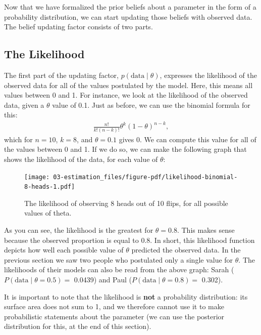 \documentclass[
  letterpaper,
  DIV=11,
  numbers=noendperiod]{scrreprt}
\begin{document}
Now that we have formalized the prior beliefs about a parameter in the
form of a probability distribution, we can start updating those beliefs
with observed data. The belief updating factor consists of two parts.

\hypertarget{the-likelihood}{%
\subsection{The Likelihood}\label{the-likelihood}}

The first part of the updating factor, \(p( \text{data} \mid \theta)\),
expresses the likelihood of the observed data for all of the values
postulated by the model. Here, this means all values between 0 and 1.
For instance, we look at the likelihood of the observed data, given a
\(\theta\) value of 0.1. Just as before, we can use the binomial formula
for this: \begin{align} 
\label{binomFormulaTwo}
\frac{n!}{k! (n-k)!} \theta^k\left(1-\theta\right)^{n-k},
\end{align} which for \(n = 10\), \(k = 8\), and \(\theta = 0.1\) gives
0. We can compute this value for all of the values between 0 and 1. If
we do so, we can make the following graph that shows the likelihood of
the data, for each value of \(\theta\):

\begin{figure}

{\centering \texttt{[image: 03-estimation\_files/figure-pdf/likelihood-binomial-8-heads-1.pdf]}

}

\caption{The likelihood of observing 8 heads out of 10 flips, for all
possible values of theta.}

\end{figure}

As you can see, the likelihood is the greatest for \(\theta = 0.8\).
This makes sense because the observed proportion is equal to \(0.8\). In
short, this likelihood function depicts how well each possible value of
\(\theta\) predicted the observed data. In the previous section we saw
two people who postulated only a single value for \(\theta\). The
likelihoods of their models can also be read from the above graph: Sarah
(\(P(\text{data} \mid \theta = 0.5) =\) 0.0439) and Paul
(\(P(\text{data} \mid \theta = 0.8) =\) 0.302).

It is important to note that the likelihood is \textbf{not} a
probability distribution: its surface area does not sum to 1, and we
therefore cannot use it to make probabilistic statements about the
parameter (we can use the posterior distribution for this, at the end of
this section).
\end{document}
